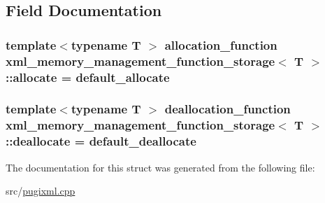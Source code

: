 \subsection{Field Documentation}
\hypertarget{structxml__memory__management__function__storage_abb6865f8d07d27fd9273737c59f6e941}{
\subsubsection[{allocate}]{\setlength{\rightskip}{0pt plus 5cm}template$<$typename T $>$ allocation\_\-function {\bf xml\_\-memory\_\-management\_\-function\_\-storage}$<$ T $>$::{\bf allocate} = default\_\-allocate}}
\label{structxml__memory__management__function__storage_abb6865f8d07d27fd9273737c59f6e941}
\hypertarget{structxml__memory__management__function__storage_a1c80a9a045ed6cfb90b17a178e4b3512}{
\subsubsection[{deallocate}]{\setlength{\rightskip}{0pt plus 5cm}template$<$typename T $>$ deallocation\_\-function {\bf xml\_\-memory\_\-management\_\-function\_\-storage}$<$ T $>$::{\bf deallocate} = default\_\-deallocate}}
\label{structxml__memory__management__function__storage_a1c80a9a045ed6cfb90b17a178e4b3512}


The documentation for this struct was generated from the following file:\begin{DoxyCompactItemize}
\item 
src/\hyperlink{pugixml_8cpp}{pugixml.cpp}\end{DoxyCompactItemize}
